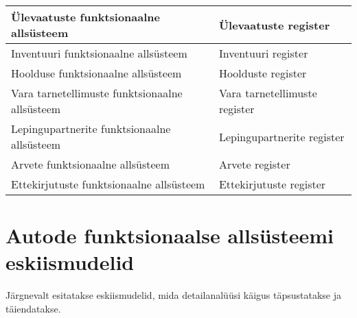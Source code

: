 \begin{table}[H]
\begin{tabular}{|l|l|}
		Ülevaatuste funktsionaalne allsüsteem                                            & Ülevaatuste register                                                                                                                                    \\ \hline
		Inventuuri funktsionaalne allsüsteem                                             & Inventuuri register                                                                                                                                     \\ \hline
		Hoolduse funktsionaalne allsüsteem                                               & Hoolduste register                                                                                                                                      \\ \hline
		Vara tarnetellimuste funktsionaalne allsüsteem                                   & Vara tarnetellimuste register                                                                                                                           \\ \hline
		Lepingupartnerite funktsionaalne allsüsteem                                      & Lepingupartnerite register                                                                                                                              \\ \hline
		Arvete funktsionaalne allsüsteem                                                 & Arvete register                                                                                                                                         \\ \hline
		Ettekirjutuste funktsionaalne allsüsteem                                         & Ettekirjutuste register                                                                                                                                 \\ \hline
	\end{tabular}
\end{table}

\newpage
\section{Autode funktsionaalse allsüsteemi eskiismudelid}
Järgnevalt esitatakse eskiismudelid, mida detailanalüüsi käigus täpsustatakse ja täiendatakse.

